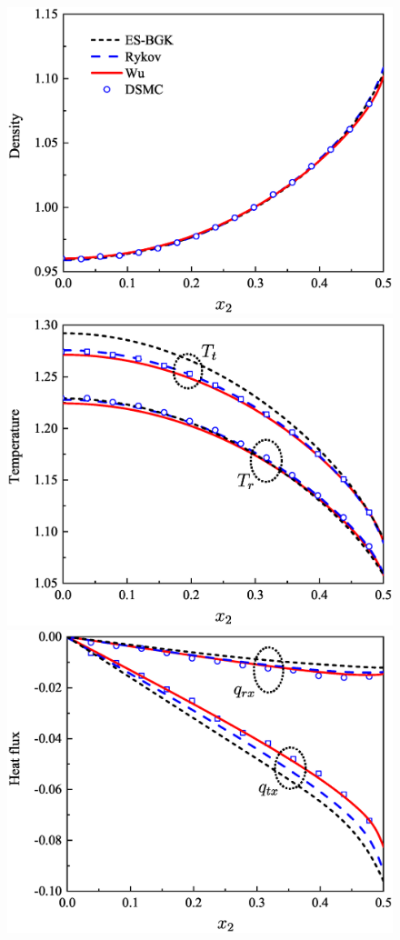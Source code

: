 \begin{figure}[t]
	\centering
	{\includegraphics[scale=0.25,clip=true]{Fig/04CF1.eps}} \quad
	{\includegraphics[scale=0.25,clip=true]{Fig/04CF2.eps}}\quad
	{\includegraphics[scale=0.25,clip=true]{Fig/04CF3.eps}} \\

\end{figure}
